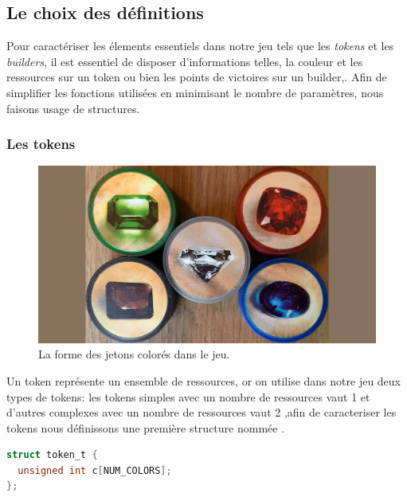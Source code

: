 \documentclass{article}
\begin{document}

\subsection{Le choix des définitions}

\vspace{1em}

\hspace{1em}Pour caractériser les élements essentiels dans notre jeu tels que les \emph{tokens} et les \emph{builders}, il est essentiel de disposer d'informations telles, la couleur et les ressources sur un token ou bien les points de victoires  sur un builder,. Afin de simplifier les fonctions utilisées en minimisant le nombre de paramètres, nous faisons usage de structures.

\subsubsection{Les tokens}

\begin{figure}[ht]
    \centering
    \includegraphics[width=0.5\linewidth]{tokens.png}
    \caption{La forme des jetons colorés dans le jeu.}
    \label{fig: LA FORME DES TOKENS  }
\end{figure}


\hspace{1em} Un token représente un ensemble de ressources, or on utilise dans notre jeu deux types  de tokens: les tokens simples avec un nombre de ressources vaut 1 et d'autres complexes avec un nombre de ressources vaut 2 ,afin de caracteriser les tokens nous définissons une première structure nommée .


\begin{tcolorbox}[colback=gray!10,colframe=white!75!black]

\begin{lstlisting}[language=C, caption={La structure caracterisant un  Token}, 
label={lst:exemple1-c}]
struct token_t {
  unsigned int c[NUM_COLORS];
};
\end{lstlisting}
\end{tcolorbox}
\end{document}
